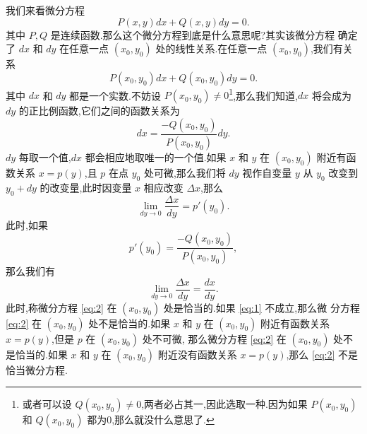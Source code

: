 \documentclass[a4paper, 12pt]{article} %
\begin{document}
\begin{CJK}{UTF8}{gbsn}
\ni 我们来看微分方程
\begin{equation}
  \label{eq:2}
  P(x,y)dx+Q(x,y)dy=0.
\end{equation}
其中 $P,Q$ 是连续函数.那么这个微分方程到底是什么意思呢?其实该微分方程
确定了 $dx$ 和 $dy$ 在任意一点 $(x_{0},y_0)$ 处的线性关系.在任意一点
$(x_0,y_0)$,我们有关系
$$
P(x_0,y_0)dx+Q(x_0,y_0)dy=0.
$$
其中 $dx$ 和 $dy$ 都是一个实数.不妨设 $P(x_0,y_0)\neq 0$\footnote{或者可以设
$Q(x_0,y_0)\neq 0$,两者必占其一,因此选取一种.因为如果 $P(x_0,y_0)$ 和 $Q(x_0,y_0)$ 都为0,那么就没什么意思了.},那么我们知道,$dx$ 将会成为 $dy$ 的正比例函数,它们之间的函数关系为
$$
dx=\frac{-Q(x_0,y_0)}{P(x_0,y_0)}dy.
$$
$dy$ 每取一个值,$dx$ 都会相应地取唯一的一个值.如果 $x$ 和 $y$ 在
$(x_0,y_0)$ 附近有函数关系 $x=p(y)$,且 $p$ 在点 $y_0$ 处可微,那么我们将 $dy$ 视作自变量
$y$ 从 $y_0$ 改变到 $y_0+dy$ 的改变量,此时因变量 $x$ 相应改变 $\Delta x$,那么
$$
\lim_{dy\to 0}\frac{\Delta x}{dy}=p'(y_{0}).
$$
此时,如果
\begin{equation}
  \label{eq:1}
  p'(y_0)=\frac{-Q(x_0,y_0)}{P(x_0,y_0)},
\end{equation}
那么我们有
$$
\lim_{dy\to 0}\frac{\Delta x}{dy}=\frac{dx}{dy}.
$$
此时,称微分方程 \eqref{eq:2} 在 $(x_0,y_0)$ 处是恰当的.如果 \eqref{eq:1} 不成立,那么微
分方程 \eqref{eq:2} 在 $(x_0,y_0)$ 处不是恰当的.如果 $x$ 和 $y$ 在
$(x_0,y_0)$ 附近有函数关系 $x=p(y)$,但是 $p$ 在 $(x_0,y_0)$ 处不可微,
那么微分方程 \eqref{eq:2} 在 $(x_0,y_0)$ 处不是恰当的.如果 $x$ 和 $y$ 在 $(x_0,y_0)$ 附近没有函数关系 $x=p(y)$,那么 \eqref{eq:2} 不是恰当微分方程.






  
  
  
  
  
\end{CJK}
\end{document}
